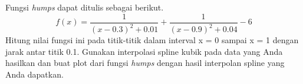 \begin{soal}
Fungsi \textit{humps} dapat ditulis sebagai berikut.
\begin{equation*}
f(x) = \frac{1}{(x - 0.3)^2 + 0.01} + \frac{1}{(x - 0.9)^2 + 0.04} - 6
\end{equation*}
Hitung nilai fungsi ini pada titik-titik dalam interval x = 0 sampai x = 1
dengan jarak antar titik 0.1. Gunakan interpolasi spline kubik pada data
yang Anda hasilkan dan buat plot dari fungsi \textit{humps} dengan
hasil interpolan spline yang Anda dapatkan.
\end{soal}
